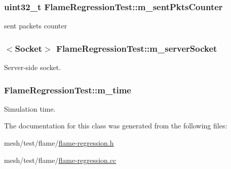 \subsubsection[{\texorpdfstring{m\+\_\+sent\+Pkts\+Counter}{m_sentPktsCounter}}]{\setlength{\rightskip}{0pt plus 5cm}uint32\+\_\+t Flame\+Regression\+Test\+::m\+\_\+sent\+Pkts\+Counter\hspace{0.3cm}{\ttfamily [private]}}\hypertarget{classFlameRegressionTest_afd9230653770d041f6b34880ecc57459}{}\label{classFlameRegressionTest_afd9230653770d041f6b34880ecc57459}


sent packets counter 

\subsubsection[{\texorpdfstring{m\+\_\+server\+Socket}{m_serverSocket}}]{$<${\bf Socket}$>$ Flame\+Regression\+Test\+::m\+\_\+server\+Socket\hspace{0.3cm}{\ttfamily [private]}}\hypertarget{classFlameRegressionTest_a9b6074ea583c3c1f7401fb47c05cd34e}{}\label{classFlameRegressionTest_a9b6074ea583c3c1f7401fb47c05cd34e}


Server-\/side socket. 

\subsubsection[{\texorpdfstring{m\+\_\+time}{m_time}}]{ Flame\+Regression\+Test\+::m\+\_\+time\hspace{0.3cm}{\ttfamily [private]}}\hypertarget{classFlameRegressionTest_a091f31a70bd540a33a5a182b85df03de}{}\label{classFlameRegressionTest_a091f31a70bd540a33a5a182b85df03de}


Simulation time. 



The documentation for this class was generated from the following files\+:\begin{DoxyCompactItemize}
\item 
mesh/test/flame/\hyperlink{flame-regression_8h}{flame-\/regression.\+h}\item 
mesh/test/flame/\hyperlink{flame-regression_8cc}{flame-\/regression.\+cc}\end{DoxyCompactItemize}
